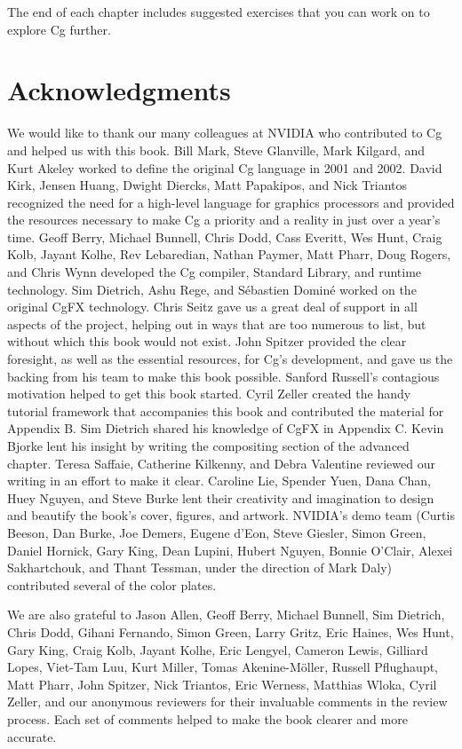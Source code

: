 \documentclass[../main.tex]{subfiles}
\begin{document}
The end of each chapter includes suggested exercises that you can work on to explore Cg further.

\section*{Acknowledgments}

We would like to thank our many colleagues at NVIDIA who contributed to Cg and helped us with this book. Bill Mark, Steve Glanville, Mark Kilgard, and Kurt Akeley worked to define the original Cg language in 2001 and 2002. David Kirk, Jensen Huang, Dwight Diercks, Matt Papakipos, and Nick Triantos recognized the need for a high-level language for graphics processors and provided the resources necessary to make Cg a priority and a reality in just over a year's time. Geoff Berry, Michael Bunnell, Chris Dodd, Cass Everitt, Wes Hunt, Craig Kolb, Jayant Kolhe, Rev Lebaredian, Nathan Paymer, Matt Pharr, Doug Rogers, and Chris Wynn developed the Cg compiler, Standard Library, and runtime technology. Sim Dietrich, Ashu Rege, and Sébastien Dominé worked on the original CgFX technology. Chris Seitz gave us a great deal of support in all aspects of the project, helping out in ways that are too numerous to list, but without which this book would not exist. John Spitzer provided the clear foresight, as well as the essential resources, for Cg's development, and gave us the backing from his team to make this book possible. Sanford Russell's contagious motivation helped to get this book started. Cyril Zeller created the handy tutorial framework that accompanies this book and contributed the material for Appendix B. Sim Dietrich shared his knowledge of CgFX in Appendix C. Kevin Bjorke lent his insight by writing the compositing section of the advanced chapter. Teresa Saffaie, Catherine Kilkenny, and Debra Valentine reviewed our writing in an effort to make it clear. Caroline Lie, Spender Yuen, Dana Chan, Huey Nguyen, and Steve Burke lent their creativity and imagination to design and beautify the book's cover, figures, and artwork. NVIDIA's demo team (Curtis Beeson, Dan Burke, Joe Demers, Eugene d'Eon, Steve Giesler, Simon Green, Daniel Hornick, Gary King, Dean Lupini, Hubert Nguyen, Bonnie O'Clair, Alexei Sakhartchouk, and Thant Tessman, under the direction of Mark Daly) contributed several of the color plates.

We are also grateful to Jason Allen, Geoff Berry, Michael Bunnell, Sim Dietrich, Chris Dodd, Gihani Fernando, Simon Green, Larry Gritz, Eric Haines, Wes Hunt, Gary King, Craig Kolb, Jayant Kolhe, Eric Lengyel, Cameron Lewis, Gilliard Lopes, Viet-Tam Luu, Kurt Miller, Tomas Akenine-Möller, Russell Pflughaupt, Matt Pharr, John Spitzer, Nick Triantos, Eric Werness, Matthias Wloka, Cyril Zeller, and our anonymous reviewers for their invaluable comments in the review process. Each set of comments helped to make the book clearer and more accurate.
\end{document}
